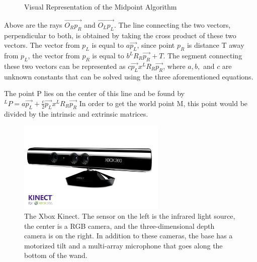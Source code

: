 \documentclass[pdftex,10.5pt]{report}
\begin{document}
\begin{figure}[H]
\centering
	\caption{Visual Representation of the Midpoint Algorithm}
\end{figure}

Above are the rays $\vec{O_{R}p_{R}}$ and $\vec{O_{L}p_{L}}$. The line connecting the two vectors, perpendicular to both, is obtained by taking the cross product of these two vectors. The vector from $p_{L}$ is equal to $a\vec{p_{L}}$, since point $p_{R}$ is distance T away from $p_{L}$, the vector from $p_{R}$ is equal to $b^{L}R_{R}\vec{p_{R}}+T$. The segment connecting these two vectors can be represented as $c\vec{p_{L}}x^{L}R_{R}\vec{p_{R}}$, where $a,b,$ and $c$ are unknown constants that can be solved using the three aforementioned equations.

The point P lies on the center of this line and be found by $^{L}P=a\vec{p_{L}}+\frac{c}{2}\vec{p_{L}}x^{L}R_{R}\vec{p_{R}}$ In order to get the world point M, this point would be divided by the intrinsic and extrinsic matrices.

\begin{figure}[H]
	\centering
	\includegraphics[width=70mm]{figures/kinect.jpg}
	\caption{The Xbox Kinect. The sensor on the left is the infrared light source, the center is a RGB camera, and the three-dimensional 				depth camera is on the right. In addition to these cameras, the base has a motorized tilt and a multi-array 				microphone that goes along the bottom of the wand.}
	\label{kinectlable}
\end{figure}
\end{document}
